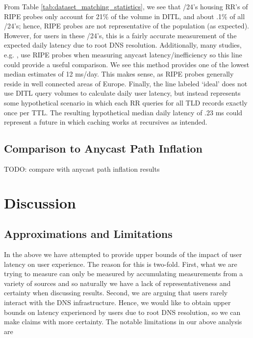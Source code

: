 \documentclass[sigconf,nonacm,10pt]{acmart}
\begin{document}
From Table \ref{tab:dataset_matching_statistics}, we see that /24's
housing RR's of RIPE probes only account for 21\% of the volume in DITL,
and about .1\% of all /24's; hence, RIPE probes are not representative
of the population (as expected). However, for users in these /24's, this
is a fairly accurate measurement of the expected daily latency due to
root DNS resolution. Additionally, many studies, e.g.
\cite{li_levin_spring_bhattacharjee_2018}, use RIPE probes when
measuring anycast latency/inefficiency so this line could provide a
useful comparison. We see this method provides one of the lowest median
estimates of 12 ms/day. This makes sense, as RIPE probes generally
reside in well connected areas of Europe. \break \break
Finally, the line labeled `ideal' does not use DITL query volumes to
calculate daily user latency, but instead represents some hypothetical
scenario in which each RR queries for all TLD records exactly once per
TTL. The resulting hypothetical median daily latency of .23 ms could
represent a future in which caching works at recursives as intended.

\subsection{Comparison to Anycast Path
Inflation}\label{comparison-to-anycast-path-inflation}

\label{sec:rr_global_look_api} TODO: compare with anycast path inflation
results

\section{Discussion}\label{discussion}

\subsection{Approximations and
Limitations}\label{approximations-and-limitations}

\label{sec:discussion_approximations} In the above we have attempted to
provide upper bounds of the impact of user latency on user experience.
The reason for this is two-fold. First, what we are trying to measure
can only be measured by accumulating measurements from a variety of
sources and so naturally we have a lack of representativeness and
certainty when discussing results. Second, we are arguing that users
rarely interact with the DNS infrastructure. Hence, we would like to
obtain upper bounds on latency experienced by users due to root DNS
resolution, so we can make claims with more certainty. \break \break
The notable limitations in our above analysis are
\end{document}

